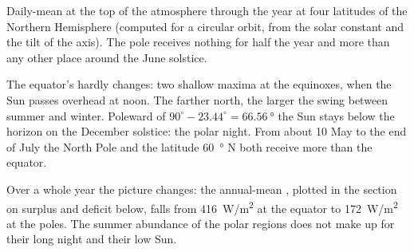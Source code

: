\begin{omfigure}

{\small Daily-mean  at the top of the atmosphere through the year
at four latitudes of the Northern Hemisphere (computed for a circular orbit,
from the solar constant and the tilt of the axis). The pole receives nothing
for half the year and more than any other place around the June solstice.}
\end{omfigure}

\begin{remark}\label{rem:g10:earth-energy-budget:curves}
The equator's  hardly changes: two shallow maxima at the
equinoxes, when the Sun passes overhead at noon. The farther north, the
larger the swing between summer and winter. Poleward of
$90^\circ - 23.44^\circ = \qty{66.56}{\degree}$ the Sun stays below the
horizon on the December solstice: the polar night. From about 10 May to the end
of July the North Pole and the latitude \qty{60}{\degree} N both receive more
than the equator.
\end{remark}

Over a whole year the picture changes: the annual-mean , plotted
in the section on surplus and deficit below, falls from \qty{416}{W/m^2} at the equator to \qty{172}{W/m^2} at
the poles. The summer abundance of the polar regions does not make up for
their long night and their low Sun.

